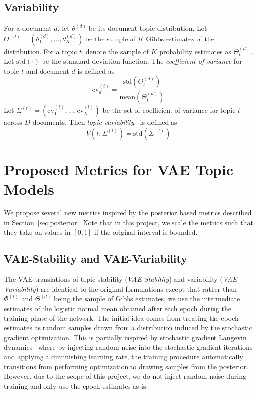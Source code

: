 \documentclass[10pt]{article}
\begin{document}
\subsection{Variability}

For a document $d$, let $\theta^{(d)}$ be its document-topic distribution. Let $\Theta^{(d)}=\left(\theta_1^{(d)},...,\theta_K^{(d)}\right)$ be the sample of $K$ Gibbs estimates of the distribution. For a topic $t$, denote the sample of $K$ probability estimates as $\Theta_t^{(d)}$. Let $\textrm{std}(\cdot)$ be the standard deviation function. The \textit{coefficient of variance} for topic $t$ and document $d$ is defined as
\[
\textrm{cv}_{d}^{(t)} = \frac{\textrm{std}\left(\Theta_t^{(d)}\right)}{\textrm{mean}\left(\Theta_t^{(d)}\right)}
\]
Let $\Sigma^{(t)}=\left(\textrm{cv}_1^{(t)},...,\textrm{cv}_D^{(t)}\right)$ be the set of coefficient of variance for topic $t$ across $D$ documents. Then \textit{topic variability}~\cite{Xing:2019} is defined as
\[
V\left(t;\Sigma^{(t)}\right) = \textrm{std}\left(\Sigma^{(t)}\right)
\]

\section{Proposed Metrics for VAE Topic Models}

We propose several new metrics inspired by the posterior based metrics described in Section~\ref{sec:posterior}. Note that in this project, we scale the metrics such that they take on values in $[0,1]$ if the original interval is bounded.

\subsection{VAE-Stability and VAE-Variability}

The VAE translations of topic stability (\textit{VAE-Stability}) and variability (\textit{VAE-Variability}) are identical to the original formulations except that rather than $\Phi^{(t)}$ and $\Theta^{(d)}$ being the sample of Gibbs estimates, we use the intermediate estimates of the logistic normal mean obtained after each epoch during the training phase of the network. The initial idea comes from treating the epoch estimates as random samples drawn from a distribution induced by the stochastic gradient optimization. This is partially inspired by stochastic gradient Langevin dynamics~\cite{Welling:2011} where by injecting random noise into the stochastic gradient iterations and applying a diminishing learning rate, the training procedure automatically transitions from performing optimization to drawing samples from the posterior. However, due to the scope of this project, we do not inject random noise during training and only use the epoch estimates as is.
\end{document}

